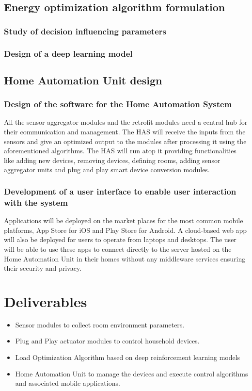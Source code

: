 \documentclass[12pt,a4paper,titlepage,twoside]{article}
\begin{document}
        \subsection{Energy optimization algorithm formulation}
        \subsubsection{Study of decision influencing parameters}
        \subsubsection{Design of a deep learning model}
        \subsection{Home Automation Unit design}
        \subsubsection{Design of the software for the Home Automation System}
        All the sensor aggregator modules and the retrofit modules need a central hub for their communication and management. The HAS will receive the inputs from the sensors and give an optimized output to the modules after processing it using the aforementioned algorithms. The HAS will run atop it providing functionalities like adding new devices, removing devices, defining rooms, adding sensor aggregator units and plug and play smart device conversion modules.
        \subsubsection{Development of a user interface to enable user interaction with the system}
        Applications will be deployed on the market places for the most common mobile platforms, App Store for iOS and Play Store for Android. A cloud-based web app will also be deployed for users to operate from laptops and desktops. The user will be able to use these apps to connect directly to the server hosted on the Home Automation Unit in their homes without any middleware services ensuring their security and privacy.
        
        
        \section{Deliverables}
            \begin{itemize}
                \item Sensor modules to collect room environment parameters.
                \item Plug and Play actuator modules to control household devices.
                \item Load Optimization Algorithm based on deep reinforcement learning models
                \item Home Automation Unit to manage the devices and execute control algorithms and associated mobile applications.		
            \end{itemize}
        
\end{document}
